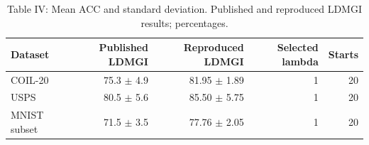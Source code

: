 \begin{table}[ht]
\centering
\caption{Table IV: Mean ACC and standard deviation. Published and reproduced LDMGI results; percentages.}
\begin{tabular}{lrrrr}
\toprule
Dataset & Published LDMGI & Reproduced LDMGI & Selected lambda & Starts \\
\midrule
COIL-20 & 75.3 $\pm$ 4.9 & 81.95 $\pm$ 1.89 & 1 & 20 \\
USPS & 80.5 $\pm$ 5.6 & 85.50 $\pm$ 5.75 & 1 & 20 \\
MNIST subset & 71.5 $\pm$ 3.5 & 77.76 $\pm$ 2.05 & 1 & 20 \\
\bottomrule
\end{tabular}
\end{table}
